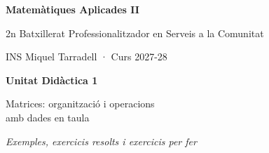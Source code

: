\documentclass[11pt,a4paper]{article}
\begin{document}
\begin{titlepage}
\centering
\vspace*{3cm}
{\Large\bfseries\color{udnavy} Matemàtiques Aplicades II\par}
\vspace{0.4cm}
{\large 2n Batxillerat Professionalitzador en Serveis a la Comunitat\par}
\vspace{0.2cm}
{\large INS Miquel Tarradell · Curs 2027-28\par}
\vspace{2cm}
{\Huge\bfseries\color{udnavy} Unitat Didàctica 1\par}
\vspace{0.4cm}
{\LARGE Matrices: organització i operacions\\ amb dades en taula\par}
\vspace{1.5cm}
{\large\itshape Exemples, exercicis resolts i exercicis per fer\par}
\vfill
\end{titlepage}

\tableofcontents
\newpage


\newpage

\end{document}
